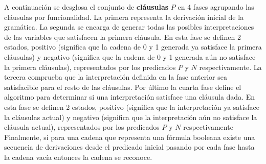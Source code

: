 A continuación se desglosa el conjunto de \textbf{cláusulas} $P$ en 4 fases agrupando las cláusulas por funcionalidad.
La primera representa la derivación inicial de la gramática. La segunda se encarga de generar todas las posibles interpretaciones
de las variables que satisfacen la primera cláusula. En esta fase se definen 2 estados, positivo (significa
que la cadena de 0 y 1 generada ya satisface la primera cláusulas) y negativo (significa que la cadena de 0 y 1
generada aún no satisface la primera cláusulas), representados por los predicados $P$ y $N$ respectivamente.
La tercera comprueba que la interpretación definida en la fase anterior sea satisfacible para el resto de las
cláusulas. Por último la cuarta fase define el algoritmo para determinar si una interpretación satisface una
cláusula dada. En esta fase se definen 2 estados, positivo (significa que la interpretación ya satisface la cláusulas actual)
y negativo (significa que la interpretación aún no satisface la cláusula actual), representados por los predicados $P$ y $N$ respectivamente  Finalmente, si para una cadena que representa una fórmula booleana existe una secuencia de
derivaciones desde el predicado inicial pasando por cada fase hasta la cadena vacía entonces la cadena se
reconoce.

